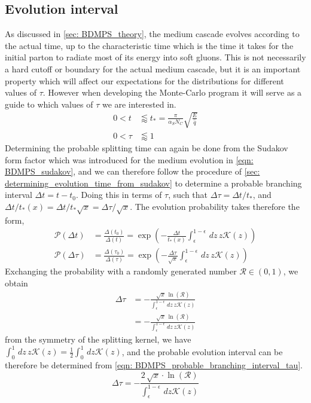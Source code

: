 \documentclass[main.tex]{subfiles}
\begin{document}
\subsection{Evolution interval}
As discussed in \autoref{sec: BDMPS_theory}, the medium cascade evolves according to the actual time, up to the characteristic time which is the time it takes for the initial parton to radiate most of its energy into soft gluons. This is not necessarily a hard cutoff or boundary for the actual medium cascade, but it is an important property which will affect our expectations for the distributions for different values of \(\tau\). However when developing the Monte-Carlo program it will serve as a guide to which values of \(\tau\) we are interested in.
\begin{align}\label{eqn: medium_evolution_boundaries}
    0 < t &\lessapprox t_* = \frac{\pi}{\alpha_S N_C} \sqrt{\frac{E}{\hat q}} \nonumber \\
    0 < \tau &\lessapprox 1
\end{align}
Determining the probable splitting time can again be done from the Sudakov form factor which was introduced for the medium evolution in \autoref{eqn: BDMPS_sudakov}, and we can therefore follow the procedure of \autoref{sec: determining_evolution_time_from_sudakov} to determine a probable branching interval \(\Delta t = t-t_0\). Doing this in terms of \(\tau\), such that \(\Delta \tau = \Delta t/t_*\), and \(\Delta t/t_*(x) = \Delta t/t_* \sqrt{x} = \Delta \tau/\sqrt{x}\). The evolution probability takes therefore the form,
\begin{align}
    \mathcal{P}(\Delta t) &= \frac{\Delta(t_0)}{\Delta(t)} = \exp \left(- \frac{\Delta t}{t_*(x)} \int_\epsilon^{1-\epsilon} \, dz\, z \mathcal{K}(z) \right) \nonumber \\
    \mathcal{P}(\Delta \tau) &= \frac{\Delta(\tau_0)}{\Delta(\tau)} = \exp \left(- \frac{\Delta \tau}{\sqrt{x}} \int_\epsilon^{1-\epsilon} \, dz\, z \mathcal{K}(z) \right)
\end{align}
Exchanging the probability with a randomly generated number \(\mathcal{R}\in (0,1)\), we obtain
\begin{align}
    \Delta \tau &= -\frac{\sqrt{x}\,\ln(\mathcal{R}) }{\int_\epsilon^{1-\epsilon} \, dz\, z \mathcal{K}(z)} \nonumber \\
    &= -\frac{\sqrt{x}\,\ln(\mathcal{R}) }{\int_\epsilon^{1-\epsilon} \, dz\, z \mathcal{K}(z)} 
\end{align}
from the symmetry of the splitting kernel, we have \(\int_0^1 \, dz\, z \mathcal{K}(z) = \frac{1}{2} \int_0^1 \, dz \mathcal{K}(z)\), and the probable evolution interval can be therefore be determined from \autoref{eqn: BDMPS_probable_branching_interval_tau}.
\begin{equation}\label{eqn: BDMPS_probable_branching_interval_tau}
    \Delta \tau = -\frac{2\, \sqrt{x}\cdot \ln(\mathcal{R}) }{\int_\epsilon^{1-\epsilon} \, dz \mathcal{K}(z)} 
\end{equation}
\end{document}
